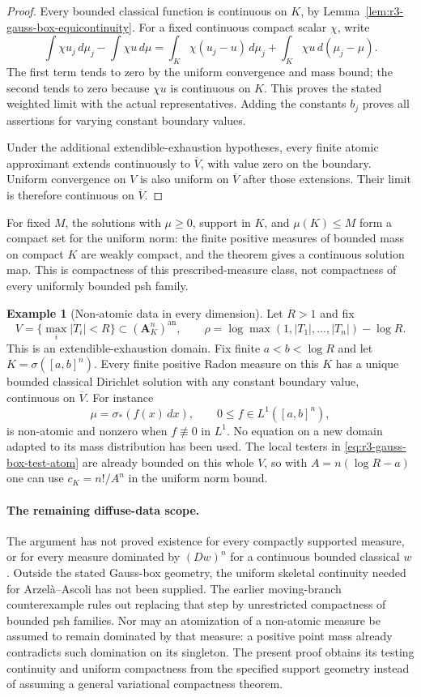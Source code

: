 \documentclass[11pt,a4paper]{article}
\numberwithin{equation}{section}
\theoremstyle{definition}
\newtheorem{example}[theorem]{Example}
\theoremstyle{remark}
\newcommand{\an}{\mathrm{an}}
\begin{document}
\begin{proof}
Every bounded classical function is continuous on $K$, by
Lemma~\ref{lem:r3-gauss-box-equicontinuity}. For a fixed
continuous compact scalar $\chi$, write
\[
 \int\chi u_j\,d\mu_j-\int\chi u\,d\mu
  =\int_K\chi(u_j-u)\,d\mu_j
       +\int_K\chi u\,d(\mu_j-\mu).
\]
The first term tends to zero by the uniform convergence and
mass bound; the second tends to zero because $\chi u$ is
continuous on $K$. This proves the stated weighted limit
with the actual representatives. Adding the constants $b_j$
proves all assertions for varying constant boundary values.

Under the additional extendible-exhaustion hypotheses, every
finite atomic approximant extends continuously to $\overline V$,
with value zero on the boundary. Uniform convergence on $V$
is also uniform on $\overline V$ after those extensions.
Their limit is therefore continuous on $\overline V$.
\end{proof}

For fixed $M$, the solutions with $\mu\geq0$, support in $K$,
and $\mu(K)\leq M$ form a compact set for the uniform norm:
the finite positive measures of bounded mass on compact $K$
are weakly compact, and the theorem gives a continuous
solution map. This is compactness of this prescribed-measure
class, not compactness of every uniformly bounded psh family.

\begin{example}[Non-atomic data in every dimension]
\label{ex:r3-skeletal-nonatomic}
Let $R>1$ and fix
\[
 V=\{\max_i|T_i|<R\}\subset(\mathbf A_K^n)^{\an},
 \qquad
 \rho=\log\max(1,|T_1|,\ldots,|T_n|)-\log R.
\]
This is an extendible-exhaustion domain. Fix finite
$a<b<\log R$ and let $K=\sigma([a,b]^n)$.
Every finite positive Radon measure on this $K$ has a
unique bounded classical Dirichlet solution with any
constant boundary value, continuous on $\overline V$.
For instance
\[
 \mu=\sigma_*(f(x)\,dx),\qquad
       0\leq f\in L^1([a,b]^n),
\]
is non-atomic and nonzero when $f\not\equiv0$ in $L^1$.
No equation on a new domain adapted to its mass distribution
has been used. The local testers in
\eqref{eq:r3-gauss-box-test-atom} are already bounded on
this whole $V$, so with $A=n(\log R-a)$ one can use
$c_K=n!/A^n$ in the uniform norm bound.
\end{example}

\paragraph{The remaining diffuse-data scope.}
The argument has not proved existence for every compactly
supported measure, or for every measure dominated by
$(Dw)^n$ for a continuous bounded classical $w$.
Outside the stated Gauss-box geometry, the uniform skeletal
continuity needed for Arzel\`a--Ascoli has not been supplied.
The earlier moving-branch counterexample rules out replacing
that step by unrestricted compactness of bounded psh families.
Nor may an atomization of a non-atomic measure be assumed to
remain dominated by that measure: a positive point mass
already contradicts such domination on its singleton.
The present proof obtains its testing continuity and uniform
compactness from the specified support geometry instead of
assuming a general variational compactness theorem.
\end{document}
